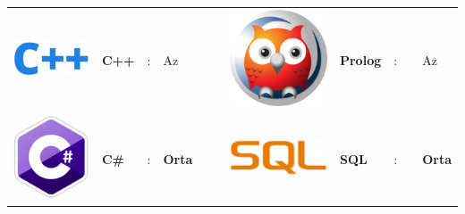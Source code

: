 \documentclass[paper=a4,fontsize=11pt]{temp} %
\begin{document}
\begin{minipage}[t]{0.66\textwidth}
\begin{tabular}{lllllllllll}
\includegraphics[scale=0.05]{IMG/languages/cplusplus} & \textbf{C++}      & : & Az  &  &  & \includegraphics[scale=0.03]{IMG/languages/prolog} & \textbf{Prolog}     & : &  & Az  \\
\includegraphics[scale=0.05]{IMG/languages/csharp} & \textbf{C\#}      & : & \textbf{Orta}  &  &  & \includegraphics[scale=0.06]{IMG/languages/sql} & \textbf{SQL}        & : &  & \textbf{Orta}   \\

\end{tabular}
\end{minipage}
\end{document}
